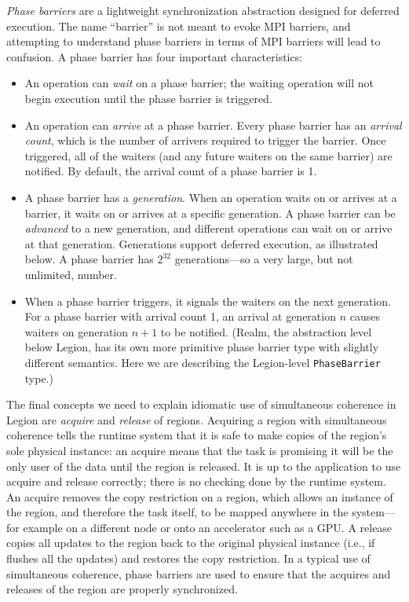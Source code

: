 {\em Phase barriers} are a lightweight synchronization abstraction designed for deferred execution.  The name ``barrier'' is not meant to evoke MPI barriers, and attempting
to understand phase barriers in terms of MPI barriers will lead to confusion.  A phase barrier has four important characteristics:
\begin{itemize}
\item An operation can {\em wait} on a phase barrier; the waiting operation will not begin execution until the phase barrier is triggered.
\item An operation can {\em arrive} at a phase barrier.  Every phase barrier has an {\em arrival count}, which is the number of arrivers required to trigger the barrier.  Once triggered, all of the waiters (and any future waiters on the same barrier) are notified.  By default,
  the arrival count of a phase barrier is 1.
\item A phase barrier has a {\em generation}.  When an operation waits on or arrives at a barrier, it waits on or arrives at a specific generation.  A phase barrier can be {\em advanced} to a new generation, and different operations can wait on or arrive at that
  generation.  Generations support deferred execution, as illustrated below.  A phase barrier has $2^{32}$ generations---so a very large, but not unlimited, number.
\item When a phase barrier triggers, it signals the waiters on the next generation.  For a phase barrier with arrival count 1, an arrival at generation $n$ causes waiters on generation $n+1$ to be notified.  (Realm, the abstraction level below Legion, has its own more primitive phase barrier type
  with slightly different semantics.  Here we are describing the Legion-level {\tt PhaseBarrier} type.)
\end{itemize}

\begin{figure}
  \centering
  
  \caption{}
  \label{fig:sim}
\end{figure}

The final concepts we need to explain idiomatic use of simultaneous coherence in Legion are {\em acquire} and {\em release} of regions.  Acquiring a region with simultaneous coherence tells the runtime system that it is safe to make copies of the region's sole physical instance: an acquire means that the task is promising it will be the only user of the data until the region is released.  It is up to the application to use acquire and release correctly; there is no checking done by the runtime system.  An acquire removes the copy restriction on a region, which allows
an instance of the region, and therefore the task itself, to be mapped anywhere in the system---for example on a different node or onto an accelerator such as a GPU.
A release copies all updates to the region back to the original physical instance (i.e., if flushes all the updates) and restores the copy restriction.  In a typical use of simultaneous coherence, phase barriers are used to ensure that the acquires and releases of the region
are properly synchronized.

